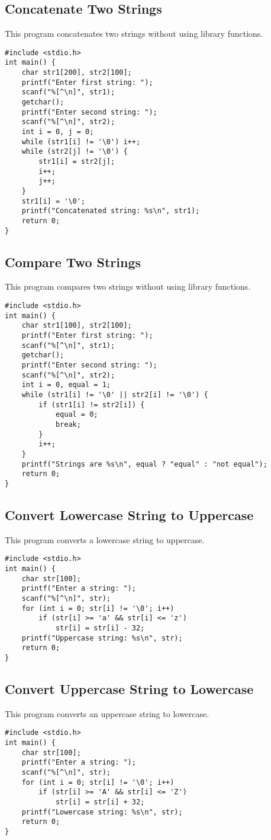 \documentclass[a4paper,12pt]{article}
\begin{document}
\subsection{Concatenate Two Strings}
This program concatenates two strings without using library functions.
\begin{lstlisting}[caption={Concatenate Two Strings}]
#include <stdio.h>
int main() {
    char str1[200], str2[100];
    printf("Enter first string: ");
    scanf("%[^\n]", str1);
    getchar();
    printf("Enter second string: ");
    scanf("%[^\n]", str2);
    int i = 0, j = 0;
    while (str1[i] != '\0') i++;
    while (str2[j] != '\0') {
        str1[i] = str2[j];
        i++;
        j++;
    }
    str1[i] = '\0';
    printf("Concatenated string: %s\n", str1);
    return 0;
}
\end{lstlisting}
\clearpage

\subsection{Compare Two Strings}
This program compares two strings without using library functions.
\begin{lstlisting}[caption={Compare Two Strings}]
#include <stdio.h>
int main() {
    char str1[100], str2[100];
    printf("Enter first string: ");
    scanf("%[^\n]", str1);
    getchar();
    printf("Enter second string: ");
    scanf("%[^\n]", str2);
    int i = 0, equal = 1;
    while (str1[i] != '\0' || str2[i] != '\0') {
        if (str1[i] != str2[i]) {
            equal = 0;
            break;
        }
        i++;
    }
    printf("Strings are %s\n", equal ? "equal" : "not equal");
    return 0;
}
\end{lstlisting}
\clearpage

\subsection{Convert Lowercase String to Uppercase}
This program converts a lowercase string to uppercase.
\begin{lstlisting}[caption={Convert Lowercase String to Uppercase}]
#include <stdio.h>
int main() {
    char str[100];
    printf("Enter a string: ");
    scanf("%[^\n]", str);
    for (int i = 0; str[i] != '\0'; i++)
        if (str[i] >= 'a' && str[i] <= 'z')
            str[i] = str[i] - 32;
    printf("Uppercase string: %s\n", str);
    return 0;
}
\end{lstlisting}
\clearpage

\subsection{Convert Uppercase String to Lowercase}
This program converts an uppercase string to lowercase.
\begin{lstlisting}[caption={Convert Uppercase String to Lower episode::Lowercase}]
#include <stdio.h>
int main() {
    char str[100];
    printf("Enter a string: ");
    scanf("%[^\n]", str);
    for (int i = 0; str[i] != '\0'; i++)
        if (str[i] >= 'A' && str[i] <= 'Z')
            str[i] = str[i] + 32;
    printf("Lowercase string: %s\n", str);
    return 0;
}
\end{lstlisting}
\clearpage
\end{document}
